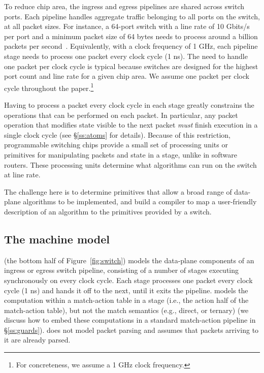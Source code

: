 To reduce chip area, the ingress and egress pipelines are shared across switch
ports.  Each pipeline handles aggregate traffic belonging to all ports on the
switch, at all packet sizes.  For instance, a 64-port switch with a line rate
of 10 Gbits/s per port and a minimum packet size of 64 bytes needs to process
around a billion packets per second~\cite{rmt}.  Equivalently, with a clock
frequency of 1 GHz, each pipeline stage needs to process one packet every clock
cycle (1 ns).  The need to handle one packet per clock cycle is typical because
switches are designed for the highest port count and line rate for a given chip
area. We assume one packet per clock cycle throughout the paper.\footnote{For
concreteness, we assume a 1 GHz clock frequency.}

Having to process a packet every clock cycle in each stage greatly
constrains the operations that can be performed on each packet. In
particular, any packet operation that modifies state visible to the
next packet {\em must} finish execution in a single clock cycle (see
\S\ref{ss:atoms} for details). Because of this restriction,
programmable switching chips provide a small set of processing units
or primitives for manipulating packets and state in a stage, unlike in
software routers. These processing units determine what algorithms can
run on the switch at line rate.

The challenge here is to determine primitives that allow a broad range of
data-plane algorithms to be implemented, and build a compiler to map a
user-friendly description of an algorithm to the primitives provided by a
switch.

\subsection{The \absmachine machine model}

\absmachine (the bottom half of Figure~\ref{fig:switch}) models the data-plane
components of an ingress or egress switch pipeline, consisting of a number of
stages executing synchronously on every clock cycle. Each stage processes one
packet every clock cycle (1 ns) and hands it off to the next, until it exits
the pipeline. \absmachine models the computation within a match-action table in
a stage (i.e., the action half of the match-action table), but not the match
semantics (e.g., direct, or ternary) (we discuss how to embed these
computations in a standard match-action pipeline in \S\ref{ss:guards}).
\absmachine does not model packet parsing and assumes that packets arriving to
it are already parsed.

